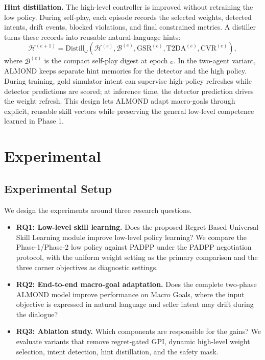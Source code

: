 \documentclass[conference]{IEEEtran}
\begin{document}
\textbf{Hint distillation.}
The high-level controller is improved without retraining the low policy.
During self-play, each episode records the selected weights, detected intents,
drift events, blocked violations, and final constrained metrics. A distiller
turns these records into reusable natural-language hints:
\begin{equation}
    \mathcal{H}^{(e+1)} =
    \mathrm{Distill}_{\omega}
    \left(\mathcal{H}^{(e)},\mathcal{B}^{(e)},
    \mathrm{GSR}^{(e)},\mathrm{T2DA}^{(e)},\mathrm{CVR}^{(e)}\right),
\end{equation}
where $\mathcal{B}^{(e)}$ is the compact self-play digest at epoch $e$. In the
two-agent variant, ALMOND keeps separate hint memories for the detector and the
high policy. During training, gold simulator intent can supervise high-policy
refreshes while detector predictions are scored; at inference time, the detector
prediction drives the weight refresh. This design lets ALMOND adapt
macro-goals through explicit, reusable skill vectors while preserving the
general low-level competence learned in Phase 1.

\section{Experimental}

\subsection{Experimental Setup}

We design the experiments around three research questions.
\begin{itemize}
    \item \textbf{RQ1: Low-level skill learning.} Does the proposed
    Regret-Based Universal Skill Learning module improve low-level policy
    learning? We compare the Phase-1/Phase-2 low policy against PADPP under the
    PADPP negotiation protocol, with the uniform weight setting as the primary
    comparison and the three corner objectives as diagnostic settings.
    \item \textbf{RQ2: End-to-end macro-goal adaptation.} Does the complete
    two-phase ALMOND model improve performance on Macro Goals, where the input
    objective is expressed in natural language and seller intent may drift
    during the dialogue?
    \item \textbf{RQ3: Ablation study.} Which components are responsible for
    the gains? We evaluate variants that remove regret-gated GPI, dynamic
    high-level weight selection, intent detection, hint distillation, and the
    safety mask.
\end{itemize}
\end{document}
